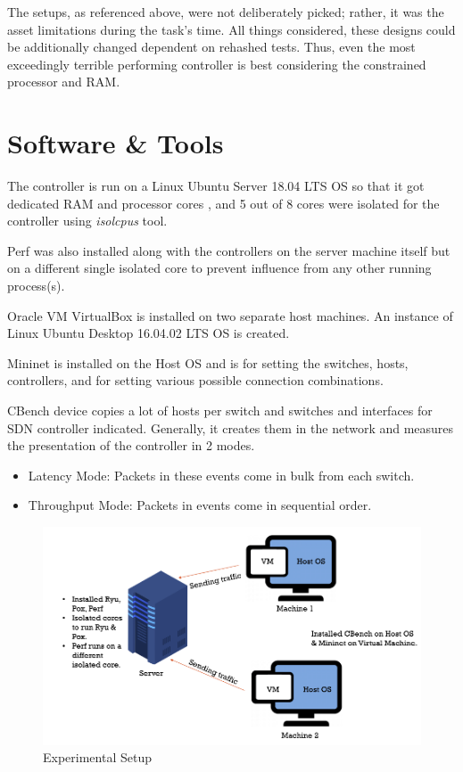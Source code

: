 The setups, as referenced above, were not deliberately picked; rather, it was the asset limitations during the task's time. All things considered, these designs could be additionally changed dependent on rehashed tests. Thus, even the most exceedingly terrible performing controller is best considering the constrained processor and RAM.

\section{Software \& Tools}
The controller is run on a Linux Ubuntu Server 18.04 LTS OS so that it got dedicated RAM and processor cores \cite{resshare1970}, and 5 out of 8 cores were isolated for the controller using \textit{isolcpus} tool.

Perf was also installed along with the controllers on the server machine itself but on a different single isolated core to prevent influence from any other running process(s).

Oracle VM VirtualBox is installed on two separate host machines. An instance of Linux Ubuntu Desktop 16.04.02 LTS OS is created.

Mininet is installed on the Host OS and is for setting the switches, hosts, controllers, and for setting various possible connection combinations.

CBench device copies a lot of hosts per switch and switches and interfaces for SDN controller indicated. Generally, it creates them in the network and measures the presentation of the controller in 2 modes.
    \begin{itemize}
        \item Latency Mode: Packets in these events come in bulk from each switch.
        \item Throughput Mode: Packets in events come in sequential order.
    \end{itemize}

\begin{figure}[!hbt]
    \centering
        \includegraphics[width=\textwidth,keepaspectratio]{images/setup.png}
       \caption{Experimental Setup}
        \label{experimentalsetup}
\end{figure}

